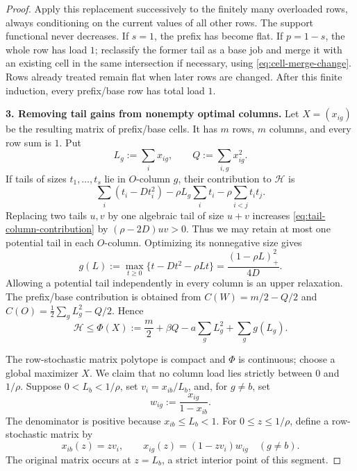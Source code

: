 \documentclass[11pt]{article}
\theoremstyle{remark}
\begin{document}
\begin{proof}
Apply this replacement successively to the finitely many overloaded
rows, always conditioning on the current values of all other rows.  The
support functional never decreases.  If $s=1$, the prefix has become
flat.  If $p=1-s$, the whole row has load $1$; reclassify the former
tail as a base job and merge it with an existing cell in the same
intersection if necessary, using \eqref{eq:cell-merge-change}.  Rows
already treated remain flat when later rows are changed.  After this
finite induction, every prefix/base row has total load $1$.

\medskip
\noindent
\textbf{3. Removing tail gains from nonempty optimal columns.}
Let $X=(x_{ig})$ be the resulting matrix of prefix/base cells.  It has
$m$ rows, $m$ columns, and every row sum is $1$.  Put
\[
 L_g:=\sum_i x_{ig},\qquad Q:=\sum_{i,g}x_{ig}^2.
\]
If tails of sizes $t_1,\dots,t_s$ lie in $O$-column $g$, their
contribution to $\mathcal H$ is
\begin{equation}\label{eq:tail-column-contribution}
 \sum_i(t_i-Dt_i^2)-\rho L_g\sum_i t_i
 -\rho\sum_{i<j}t_it_j.
\end{equation}
Replacing two tails $u,v$ by one algebraic tail of size $u+v$
increases \eqref{eq:tail-column-contribution} by
$(\rho-2D)uv>0$.  Thus we may retain at most one potential tail in
each $O$-column.  Optimizing its nonnegative size gives
\begin{equation}\label{eq:gL}
 g(L):=\max_{t\geq0}\{t-Dt^2-\rho Lt\}
      =\frac{(1-\rho L)_+^2}{4D}.
\end{equation}
Allowing a potential tail independently in every column is an upper
relaxation.  The prefix/base contribution is obtained from
$C(W)=m/2-Q/2$ and
$C(O)=\frac12\sum_gL_g^2-Q/2$.  Hence
\begin{equation}\label{eq:H-flat-upper}
 \mathcal H\leq \Phi(X):=\frac m2+\beta Q-a\sum_gL_g^2+
                    \sum_g g(L_g).
\end{equation}

The row-stochastic matrix polytope is compact and $\Phi$ is continuous;
choose a global maximizer $X$.  We claim that no column load lies
strictly between $0$ and $1/\rho$.  Suppose
$0<L_b<1/\rho$, set $v_i=x_{ib}/L_b$, and, for $g\neq b$, set
\[
 w_{ig}:=\frac{x_{ig}}{1-x_{ib}}.
\]
The denominator is positive because $x_{ib}\leq L_b<1$.  For
$0\leq z\leq1/\rho$, define a row-stochastic matrix by
\begin{equation}\label{eq:column-variation}
 x_{ib}(z)=zv_i,\qquad
 x_{ig}(z)=(1-zv_i)w_{ig}\quad(g\neq b).
\end{equation}
The original matrix occurs at $z=L_b$, a strict interior point of this
segment.


\end{proof}
\end{document}
